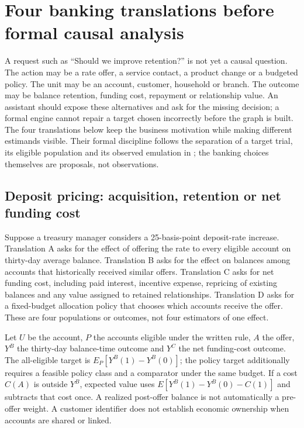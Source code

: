 \chapter{Four banking translations before formal causal analysis}
\label{exec13:l2-translation}

A request such as ``Should we improve retention?'' is not yet a causal question. The action may be a rate offer, a service contact, a product change or a budgeted policy. The unit may be an account, customer, household or branch. The outcome may be balance retention, funding cost, repayment or relationship value. An assistant should expose these alternatives and ask for the missing decision; a formal engine cannot repair a target chosen incorrectly before the graph is built. The four translations below keep the business motivation while making different estimands visible. Their formal discipline follows the separation of a target trial, its eligible population and its observed emulation in \citet{hernan2020}; the banking choices themselves are proposals, not observations.

\section{Deposit pricing: acquisition, retention or net funding cost}

Suppose a treasury manager considers a 25-basis-point deposit-rate increase. Translation A asks for the effect of offering the rate to every eligible account on thirty-day average balance. Translation B asks for the effect on balances among accounts that historically received similar offers. Translation C asks for net funding cost, including paid interest, incentive expense, repricing of existing balances and any value assigned to retained relationships. Translation D asks for a fixed-budget allocation policy that chooses which accounts receive the offer. These are four populations or outcomes, not four estimators of one effect.

Let $U$ be the account, $P$ the accounts eligible under the written rule, $A$ the offer, $Y^B$ the thirty-day balance-time outcome and $Y^C$ the net funding-cost outcome. The all-eligible target is $E_P[Y^B(1)-Y^B(0)]$; the policy target additionally requires a feasible policy class and a comparator under the same budget. If a cost $C(A)$ is outside $Y^B$, expected value uses $E[Y^B(1)-Y^B(0)-C(1)]$ and subtracts that cost once. A realized post-offer balance is not automatically a pre-offer weight. A customer identifier does not establish economic ownership when accounts are shared or linked.

